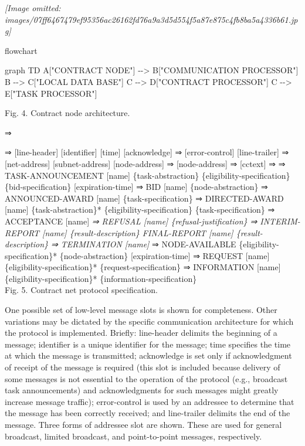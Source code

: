 \documentclass[
]{article}
\newenvironment{Shaded}{}{}
\newcommand{\NormalTok}[1]{#1}
\begin{document}
\textit{[Image omitted: images/07ff6467479ef95356ac26162fd76a9a3d5d554f5a87e875c4fb8ba5a4336b61.jpg]}

flowchart

\begin{Shaded}
\begin{Highlighting}[]
\NormalTok{graph TD}
\NormalTok{    A["CONTRACT NODE"] {-}{-}\textgreater{} B["COMMUNICATION PROCESSOR"]}
\NormalTok{    B {-}{-}\textgreater{} C["LOCAL DATA BASE"]}
\NormalTok{    C {-}{-}\textgreater{} D["CONTRACT PROCESSOR"]}
\NormalTok{    C {-}{-}\textgreater{} E["TASK PROCESSOR"]}
\end{Highlighting}
\end{Shaded}

Fig. 4. Contract node architecture.

⇒

⇒ {[}line-header{]} {[}identifier{]} {[}time{]} {[}acknowledge{]} ⇒
{[}error-control{]} {[}line-trailer{]} ⇒ {[}net-address{]} \textbar{}
{[}subnet-address{]} \textbar{} {[}node-address{]} ⇒ {[}node-address{]}
⇒ {[}cctext{]} \textbar{} ⇒ \textbar{} \textbar{} \textbar{} \textbar{}
\textbar{} \textbar{} \textbar{} \textbar{} \textbar{} ⇒
TASK-ANNOUNCEMENT {[}name{]} \{task-abstraction\}
\{eligibility-specification\} \{bid-specification\}
{[}expiration-time{]} ⇒ BID {[}name{]} \{node-abstraction\} ⇒
ANNOUNCED-AWARD {[}name{]} \{task-specification\} ⇒ DIRECTED-AWARD
{[}name{]} \{task-abstraction\}* \{eligibility-specification\}
\{task-specification\} ⇒ ACCEPTANCE {[}name{]}\emph{ ⇒ REFUSAL
{[}name{]} \{refusal-justification\} ⇒ INTERIM-REPORT {[}name{]}
\{result-description\} FINAL-REPORT {[}name{]} \{result-description\} ⇒
TERMINATION {[}name{]}} ⇒ NODE-AVAILABLE \{eligibility-specification\}*
\{node-abstraction\} {[}expiration-time{]} ⇒ REQUEST {[}name{]}
\{eligibility-specification\}* \{request-specification\} ⇒ INFORMATION
{[}name{]} \{eligibility-specification\}*
\{information-specification\}\\
Fig. 5. Contract net protocol specification.

One possible set of low-level message slots is shown for completeness.
Other variations may be dictated by the specific communication
architecture for which the protocol is implemented. Briefly: line-header
delimits the beginning of a message; identifier is a unique identifier
for the message; time specifies the time at which the message is
transmitted; acknowledge is set only if acknowledgment of receipt of the
message is required (this slot is included because delivery of some
messages is not essential to the operation of the protocol (e.g.,
broadcast task announcements) and acknowledgments for such messages
might greatly increase message traffic); error-control is used by an
addressee to determine that the message has been correctly received; and
line-trailer delimits the end of the message. Three forms of addressee
slot are shown. These are used for general broadcast, limited broadcast,
and point-to-point messages, respectively.
\end{document}
